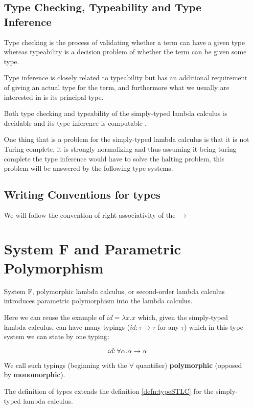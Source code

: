 \subsection{Type Checking, Typeability and Type Inference}

Type checking is the process of validating whether a term can have a given type whereas typeability is a decision problem of whether the term can be given some type.

Type inference is closely related to typeability but has an additional requirement of giving an actual type for the term, and furthermore what we usually are interested in is its principal type.

Both type checking and typeability of the simply-typed lambda calculus is decidable and its type inference is computable \cite{barendregt1992lambda}.

One thing that is a problem for the simply-typed lambda calculus is that it is not Turing complete, it is strongly normalizing \cite{barendregt1992lambda} and thus assuming it being turing complete the type inference would have to solve the halting problem, this problem will be answered by the following type systems.

\subsection{Writing Conventions for types}

We will follow the convention of right-associativity of the $\rightarrow$

\section{System F and Parametric Polymorphism}

System F, polymorphic lambda calculus, or second-order lambda calculus introduces parametric polymorphism into the lambda calculus.

Here we can reuse the example of $id = \lambda x . x$ which, given the simply-typed lambda calculus, can have many typings ($id : \tau \rightarrow \tau$ for any $\tau$) which in this type system we can state by one typing:

$$id : \forall \alpha . \alpha \rightarrow \alpha$$

We call such typings (beginning with the $\forall$ quantifier) \textbf{polymorphic} (opposed by \textbf{monomorphic}).

The definition of types extends the definition \ref{defn:typeSTLC} for the simply-typed lambda calculus.

